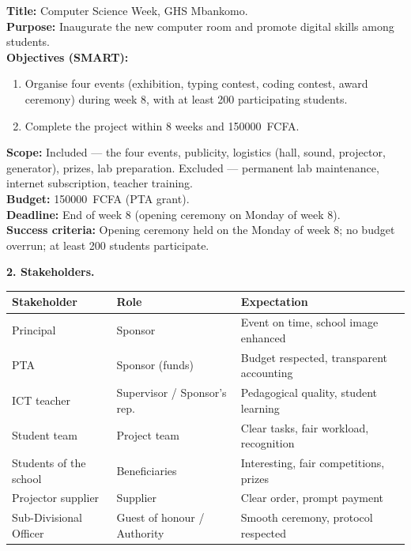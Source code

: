 \documentclass[11pt]{article}
\begin{document}
\begin{definition}
\textbf{Title:} Computer Science Week, GHS Mbankomo. \\
\textbf{Purpose:} Inaugurate the new computer room and promote digital skills among students. \\
\textbf{Objectives (SMART):} 
\begin{enumerate}
\item Organise four events (exhibition, typing contest, coding contest, award ceremony) during week 8, with at least 200 participating students.
\item Complete the project within 8 weeks and \SI{150000}{FCFA}.
\end{enumerate}
\textbf{Scope:} Included --- the four events, publicity, logistics (hall, sound, projector, generator), prizes, lab preparation. Excluded --- permanent lab maintenance, internet subscription, teacher training. \\
\textbf{Budget:} \SI{150000}{FCFA} (PTA grant). \\
\textbf{Deadline:} End of week 8 (opening ceremony on Monday of week 8). \\
\textbf{Success criteria:} Opening ceremony held on the Monday of week 8; no budget overrun; at least 200 students participate.
\end{definition}

\textbf{2. Stakeholders.}

\begin{center}
\begin{tabularx}{\linewidth}{|l|X|X|}
\hline
\rowcolor{popblueL} \textbf{Stakeholder} & \textbf{Role} & \textbf{Expectation} \\
\hline
Principal & Sponsor & Event on time, school image enhanced \\
\hline
PTA & Sponsor (funds) & Budget respected, transparent accounting \\
\hline
ICT teacher & Supervisor / Sponsor's rep. & Pedagogical quality, student learning \\
\hline
Student team & Project team & Clear tasks, fair workload, recognition \\
\hline
Students of the school & Beneficiaries & Interesting, fair competitions, prizes \\
\hline
Projector supplier & Supplier & Clear order, prompt payment \\
\hline
Sub-Divisional Officer & Guest of honour / Authority & Smooth ceremony, protocol respected \\
\hline
\end{tabularx}
\end{center}
\end{document}
